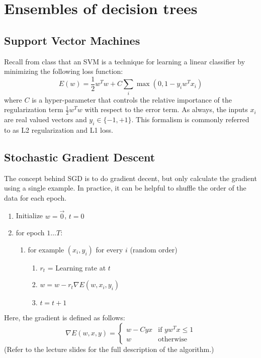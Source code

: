 \section{Ensembles of decision trees}
\label{sec:expt}

\subsection*{Support Vector Machines}
Recall from class that an SVM is a technique for learning a linear
classifier by minimizing the following loss function:
%
$$ E(w) = \frac{1}{2}w^Tw + C \sum_i \max (0, 1-y_i w^Tx_i)$$
%
where $C$ is a hyper-parameter that controls the relative importance
of the regularization term $\frac{1}{2}w^Tw$ with respect to the error
term. As always, the inputs $x_i$ are real valued vectors and
$y_i \in \{-1, +1\}$. This formalism is commonly referred to as L2 regularization and L1 loss.

\subsection*{Stochastic Gradient Descent}
The concept behind SGD is to do gradient decent, but only calculate
the gradient using a single example. In practice, it can be helpful to
shuffle the order of the data for each epoch.
%
\begin{enumerate}
\item Initialize $w = \vec{0}$, $t = 0$
\item for epoch $1 \ldots T$:
  \begin{enumerate}
    \item for example $(x_i, y_i)$ for every $i$ (random order)
        \begin{enumerate}
        \item $r_t$ = Learning rate at $t$
        \item $w = w - r_t \nabla E(w, x_i, y_i)$
        \item $t = t + 1$
        \end{enumerate}
    \end{enumerate}
\end{enumerate}
%

Here, the gradient is defined as follows:
$$ \nabla E(w, x, y) =
\begin{cases}
	w - C y x  & \text{if } y w^T x \leq 1 \\
	w & \text{otherwise}
\end{cases}
$$
(Refer to the lecture slides for the full description of the
algorithm.)

